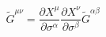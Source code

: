 \begin{equation}
\tilde G^{\mu\nu}=\frac{\partial
X^\mu}{\partial\sigma^\alpha}\frac{\partial
X^\nu}{\partial\sigma^\beta}\tilde G^{\alpha\beta}
\end{equation}

